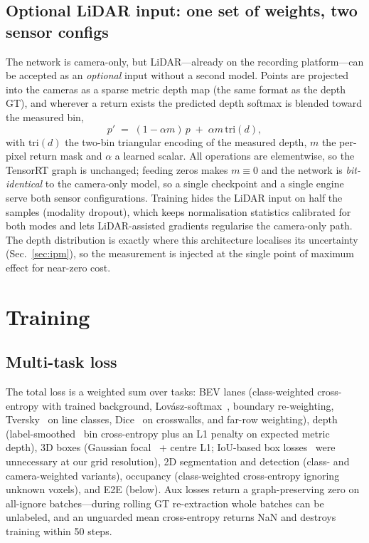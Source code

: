 \documentclass[10pt,twocolumn]{article}
\begin{document}
\subsection{Optional LiDAR input: one set of weights, two sensor configs}
\label{sec:lidaropt}
The network is camera-only, but LiDAR---already on the recording
platform---can be accepted as an \emph{optional} input without a second
model. Points are projected into the cameras as a sparse metric depth map
(the same format as the depth GT), and wherever a return exists the
predicted depth softmax is blended toward the measured bin,
\[
p' \;=\; (1-\alpha m)\,p \;+\; \alpha m\,\mathrm{tri}(d),
\]
with $\mathrm{tri}(d)$ the two-bin triangular encoding of the measured
depth, $m$ the per-pixel return mask and $\alpha$ a learned scalar. All
operations are elementwise, so the TensorRT graph is unchanged; feeding
zeros makes $m\equiv 0$ and the network is \emph{bit-identical} to the
camera-only model, so a single checkpoint and a single engine serve both
sensor configurations. Training hides the LiDAR input on half the samples
(modality dropout), which keeps normalisation statistics calibrated for
both modes and lets LiDAR-assisted gradients regularise the camera-only
path. The depth distribution is exactly where this architecture localises
its uncertainty (Sec.~\ref{sec:ipm}), so the measurement is injected at
the single point of maximum effect for near-zero cost.

\section{Training}
\label{sec:training}

\subsection{Multi-task loss}
The total loss is a weighted sum over tasks: BEV lanes (class-weighted
cross-entropy with trained background, Lov\'asz-softmax~\citep{berman2018lovasz},
boundary re-weighting, Tversky~\citep{salehi2017tversky} on line classes, Dice~\citep{milletari2016vnet}
on crosswalks, and far-row weighting), depth (label-smoothed~\citep{szegedy2016inception} bin
cross-entropy plus an L1 penalty on expected metric depth), 3D boxes
(Gaussian focal~\citep{lin2017focal,zhou2019objects} + centre L1; IoU-based box losses~\citep{rezatofighi2019giou} were unnecessary at our grid resolution), 2D
segmentation and detection (class- and camera-weighted variants), occupancy
(class-weighted cross-entropy ignoring unknown voxels), and E2E (below). Aux
losses return a graph-preserving zero on all-ignore batches---during rolling
GT re-extraction whole batches can be unlabeled, and an unguarded mean
cross-entropy returns NaN and destroys training within 50 steps.
\end{document}
